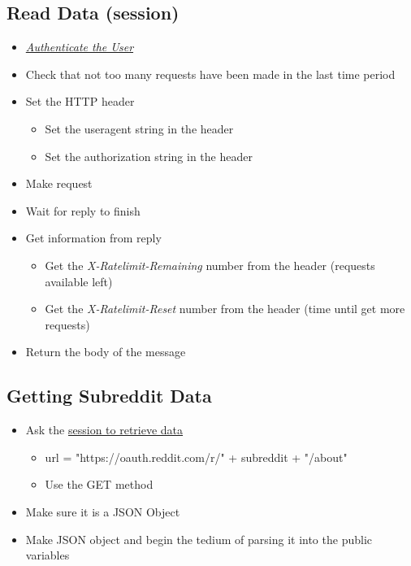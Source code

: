 \documentclass[12pt]{article}
\begin{document}
\hypertarget{Read Data (session)}{
\subsection{Read Data (session)}
}
\begin{itemize}
	\item \hyperlink{Authenticate the User (session)}{\textit{Authenticate the User}}
	\item Check that not too many requests have been made in the last time period
	\item Set the HTTP header
	\begin{itemize}
		\item Set the useragent string in the header
		\item Set the authorization string in the header
	\end{itemize}
	\item Make request
	\item Wait for reply to finish
	\item Get information from reply
	\begin{itemize}
		\item Get the \textit{X-Ratelimit-Remaining} number from the header (requests available left)
		\item Get the \textit{X-Ratelimit-Reset} number from the header (time until get more requests)
	\end{itemize}
	\item Return the body of the message
\end{itemize}

\subsection{Getting Subreddit Data}
\begin{itemize}
	\item Ask the \hyperlink{Read Data (session)}{session to retrieve data}
	\begin{itemize}
		\item url = "https://oauth.reddit.com/r/" + subreddit + "/about"
		\item Use the GET method
	\end{itemize}
	\item Make sure it is a JSON Object
	\item Make JSON object and begin the tedium of parsing it into the public variables
\end{itemize}
\end{document}
